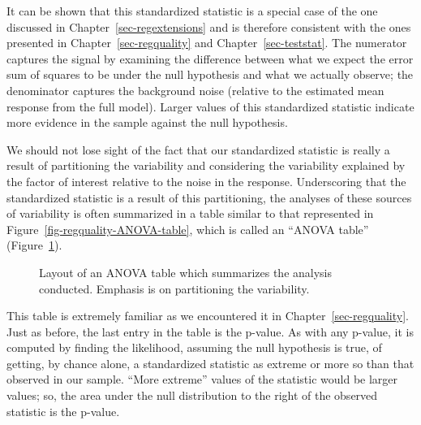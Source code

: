 \documentclass[
  letterpaper,
  DIV=11,
  numbers=noendperiod]{scrreprt}
\theoremstyle{plain}
\theoremstyle{definition}
\theoremstyle{definition}
\theoremstyle{remark}
\begin{document}
It can be shown that this standardized statistic is a special case of
the one discussed in Chapter~\ref{sec-regextensions} and is therefore
consistent with the ones presented in Chapter~\ref{sec-regquality} and
Chapter~\ref{sec-teststat}. The numerator captures the signal by
examining the difference between what we expect the error sum of squares
to be under the null hypothesis and what we actually observe; the
denominator captures the background noise (relative to the estimated
mean response from the full model). Larger values of this standardized
statistic indicate more evidence in the sample against the null
hypothesis.

We should not lose sight of the fact that our standardized statistic is
really a result of partitioning the variability and considering the
variability explained by the factor of interest relative to the noise in
the response. Underscoring that the standardized statistic is a result
of this partitioning, the analyses of these sources of variability is
often summarized in a table similar to that represented in
Figure~\ref{fig-regquality-ANOVA-table}, which is called an ``ANOVA
table'' (Figure~\ref{fig-anovateststat-anova-table}).

\begin{figure}


\caption{\label{fig-anovateststat-anova-table}Layout of an ANOVA table
which summarizes the analysis conducted. Emphasis is on partitioning the
variability.}

\end{figure}%

This table is extremely familiar as we encountered it in
Chapter~\ref{sec-regquality}. Just as before, the last entry in the
table is the p-value. As with any p-value, it is computed by finding the
likelihood, assuming the null hypothesis is true, of getting, by chance
alone, a standardized statistic as extreme or more so than that observed
in our sample. ``More extreme'' values of the statistic would be larger
values; so, the area under the null distribution to the right of the
observed statistic is the p-value.
\end{document}
